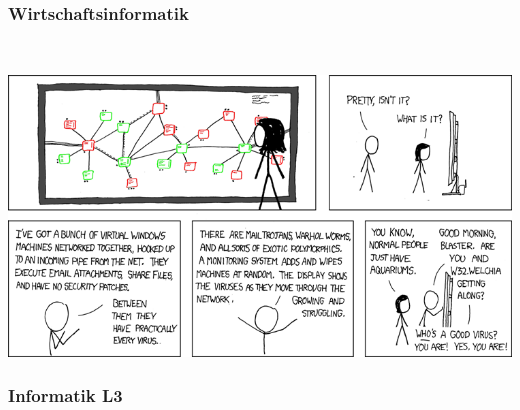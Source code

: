 \documentclass[12pt,a4paper]{scrartcl}
\begin{document}
	\subsubsection{Wirtschaftsinformatik}
    \\
    \begin{center}
        \includegraphics[width=\textwidth]{comics/network.png}
    \end{center}
\newpage
	\subsubsection{Informatik L3}
	
\newpage


	
\newpage
\end{document}
